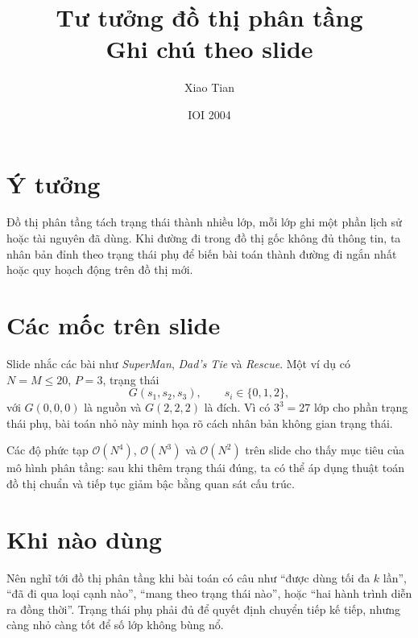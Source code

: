 \documentclass[11pt]{article}
\title{Tư tưởng đồ thị phân tầng\\{\large Ghi chú theo slide}}
\author{Xiao Tian}
\date{IOI 2004}
\newcommand{\Oh}{\mathcal{O}}
\begin{document}
\maketitle


\section{Ý tưởng}

Đồ thị phân tầng tách trạng thái thành nhiều lớp, mỗi lớp ghi một phần lịch
sử hoặc tài nguyên đã dùng. Khi đường đi trong đồ thị gốc không đủ thông tin,
ta nhân bản đỉnh theo trạng thái phụ để biến bài toán thành đường đi ngắn
nhất hoặc quy hoạch động trên đồ thị mới.

\section{Các mốc trên slide}

Slide nhắc các bài như \emph{SuperMan}, \emph{Dad's Tie} và \emph{Rescue}.
Một ví dụ có \(N=M\le 20\), \(P=3\), trạng thái
\[
  G(s_1,s_2,s_3),\qquad s_i\in\{0,1,2\},
\]
với \(G(0,0,0)\) là nguồn và \(G(2,2,2)\) là đích. Vì có \(3^3=27\) lớp cho
phần trạng thái phụ, bài toán nhỏ này minh họa rõ cách nhân bản không gian
trạng thái.

Các độ phức tạp \(\Oh(N^4)\), \(\Oh(N^3)\) và \(\Oh(N^2)\) trên slide cho
thấy mục tiêu của mô hình phân tầng: sau khi thêm trạng thái đúng, ta có thể
áp dụng thuật toán đồ thị chuẩn và tiếp tục giảm bậc bằng quan sát cấu trúc.

\section{Khi nào dùng}

Nên nghĩ tới đồ thị phân tầng khi bài toán có câu như ``được dùng tối đa
\(k\) lần'', ``đã đi qua loại cạnh nào'', ``mang theo trạng thái nào'', hoặc
``hai hành trình diễn ra đồng thời''. Trạng thái phụ phải đủ để quyết định
chuyển tiếp kế tiếp, nhưng càng nhỏ càng tốt để số lớp không bùng nổ.
\end{document}
